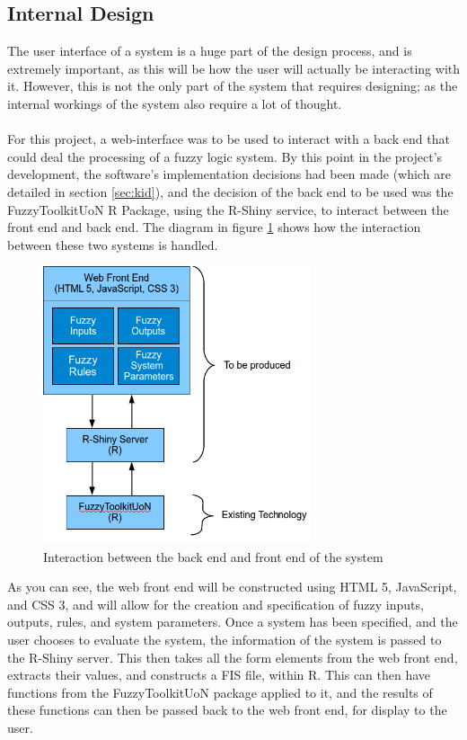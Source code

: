 \subsection{Internal Design}
The user interface of a system is a huge part of the design process, and is extremely important, as this will be how the user will actually be interacting with it. However, this is not the only part of the system that requires designing; as the internal workings of the system also require a lot of thought. \ \\
\ \\
For this project, a web-interface was to be used to interact with a back end that could deal the processing of a fuzzy logic system. By this point in the project's development, the software's implementation decisions had been made (which are detailed in section \ref{sec:kid}), and the decision of the back end to be used was the FuzzyToolkitUoN R Package, using the R-Shiny service, to interact between the front end and back end. The diagram in figure \ref{fig:architectureDiagram} shows how the interaction between these two systems is handled.

\begin{figure}[ht!]
\begin{center}
\includegraphics[width=0.7\textwidth]{images/architecture}
\end{center}
\caption{Interaction between the back end and front end of the system}
\label{fig:architectureDiagram}
\end{figure}

\noindent
As you can see, the web front end will be constructed using HTML 5, JavaScript, and CSS 3, and will allow for the creation and specification of fuzzy inputs, outputs, rules, and system parameters. Once a system has been specified, and the user chooses to evaluate the system, the information of the system is passed to the R-Shiny server. This then takes all the form elements from the web front end, extracts their values, and constructs a FIS file, within R. This can then have functions from the FuzzyToolkitUoN package applied to it, and the results of these functions can then be passed back to the web front end, for display to the user.
\newpage 